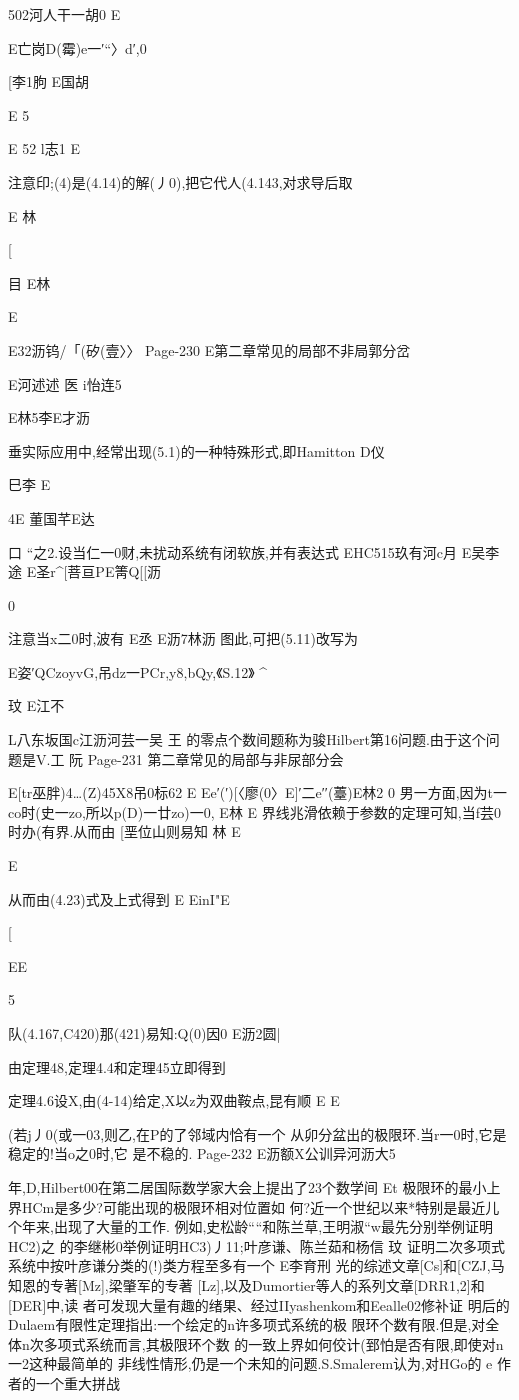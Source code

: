 {{{{{{{{{{{{{502河人干一胡0
E

E亡岗D(霉)e一′“〉d′,0

[李1朐
E国胡

E
5

E
52
l志1
E

注意印;(4)是(4.14)的解(丿0),把它代人(4.143,对求导后取

E
林

[

目
E林

E

E32沥钨/「(矽(壹〉〉
Page-230
E第二章常见的局部不非局郭分岔

E河述述
医
i怡连5

E林5李E才沥

垂实际应用中,经常出现(5.1)的一种特殊形式,即Hamitton
D仪

巳李
E

4E
董国芊E达

口
“之2.设当仁一0财,未扰动系统有闭软族,并有表达式
EHC515玖有河c月
E吴李途
E圣r^[菩亘PE箐Q[[沥

0

注意当x二0时,波有
E丞
E沥7林沥
图此,可把(5.11)改写为

E姿′QCzoyvG,吊dz一PCr,y8,bQy,《S.12》
^

玟
E江不

L八东坂国c江沥河芸一吴
王
的零点个数间题称为骏Hilbert第16问题.由于这个问题是V.工
阮
Page-231
第二章常见的局部与非尿部分会

E[tr巫胖)4…(Z)45X8吊0标62
E
Ee′(′)[〈廖(0〉E]′二e′′(薹)E林2
0
男一方面,因为t一co时(史一zo,所以p(D)一廿zo)一0,
E林
E
界线兆滑依赖于参数的定理可知,当f芸0时办(有界.从而由
[垩位山则易知
林
E

E

从而由(4.23)式及上式得到
E
EinI"E

[

EE

5

队(4.167,C420)那(421)易知:Q(0)因0
E沥2圆|

由定理48,定理4.4和定理45立即得到

定理4.6设X,由(4-14)给定,X以z为双曲鞍点,昆有顺
E
E

(若j丿0(或一03,则乙,在P的了邻域内恰有一个
从卯分盆出的极限环.当r一0时,它是稳定的!当o之0时,它
是不稳的.
Page-232
E沥额X公训异河沥大5

年,D,Hilbert00在第二居国际数学家大会上提出了23个数学间
Et
极限环的最小上界HCm是多少?可能出现的极限环相对位置如
何?近一个世纪以来*特别是最近儿个年来,出现了大量的工作.
例如,史松龄““和陈兰草,王明淑“w最先分别举例证明HC2)之
的李继彬0举例证明HC3)丿11;叶彦谦、陈兰茹和杨信
玟
证明二次多项式系统中按叶彦谦分类的(!)类方程至多有一个
E李育刑
光的综述文章[Cs]和[CZJ,马知恩的专著[Mz],梁肇军的专著
[Lz],以及Dumortier等人的系列文章[DRR1,2]和[DER]中,读
者可发现大量有趣的绪果、经过IIyashenkom和Eealle02修补证
明后的Dulaem有限性定理指出:一个绘定的n许多项式系统的极
限环个数有限.但是,对全体n次多项式系统而言,其极限环个数
的一致上界如何佼计(郅怕是否有限,即使对n一2这种最简单的
非线性情形,仍是一个未知的问题.S.Smalerem认为,对HGo的
e
作者的一个重大拼战

}}}}}}}}}}}}}
